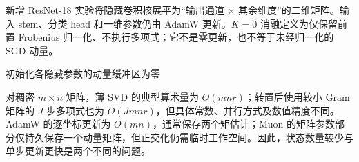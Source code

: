 新增 ResNet-18 实验将隐藏卷积核展平为“输出通道 $\times$ 其余维度”的二维矩阵。输入 stem、分类 head 和一维参数仍由 AdamW 更新。$K=0$ 消融定义为仅保留前置 Frobenius 归一化、不执行多项式；它不是零更新，也不等于未经归一化的 SGD 动量。
\begin{algorithm}[htbp]
\caption{实际混合 Muon 的参数分组与更新}\label{alg:hybrid}
初始化各隐藏参数的动量缓冲区为零\;
\end{algorithm}

对稠密 $m\times n$ 矩阵，薄 SVD 的典型算术量为 $O(mnr)$；转置后使用较小 Gram 矩阵的 $J$ 步多项式也为 $O(Jmnr)$，但具体常数、并行方式及数值精度不同。AdamW 的逐坐标更新为 $O(mn)$，通常保存两个矩估计；Muon 的矩阵参数部分仅持久保存一个动量矩阵，但正交化仍需临时工作空间。因此，状态数量较少与单步更新更快是两个不同的问题。


\FloatBarrier
